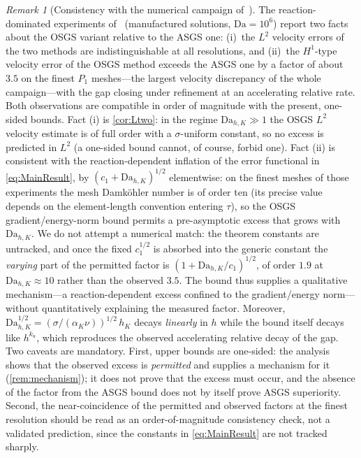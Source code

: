 \documentclass[11pt]{article}
\theoremstyle{remark}
\newtheorem{remark}[theorem]{Remark}
\newcommand{\Dah}{\mathrm{Da}_{h,K}}
\begin{document}
\begin{remark}[Consistency with the numerical campaign of~\cite{companion}]
\label{rem:numerics}
The reaction-dominated experiments of~\cite{companion} (manufactured
solutions, $\mathrm{Da} = 10^6$) report two facts about the OSGS variant relative to the ASGS
one: (i)~the $L^2$ velocity errors of the two methods are indistinguishable at all
resolutions, and (ii)~the $H^1$-type velocity error of the OSGS method exceeds the
ASGS one by a factor of about $3.5$ on the finest $P_1$ meshes---the largest velocity
discrepancy of the whole campaign---with the gap closing under refinement at an
accelerating relative rate. Both observations are compatible in order of magnitude with
the present, one-sided bounds. Fact (i) is \cref{cor:Ltwo}: in the regime $\Dah \gg 1$ the
OSGS $L^2$ velocity estimate is of full order with a $\sigma$-uniform constant, so no excess
is predicted in $L^2$ (a one-sided bound cannot, of course, forbid one). Fact (ii) is consistent with the
reaction-dependent inflation of the error functional in \cref{eq:MainResult}, by
$(c_1+\Dah)^{1/2}$ elementwise: on the finest meshes of those experiments the mesh
Damk\"ohler number is of order ten (its precise value depends on the element-length
convention entering $\tau$), so the OSGS gradient/energy-norm bound permits a
pre-asymptotic excess that grows with $\Dah$. We do not attempt a numerical match:
the theorem constants are untracked, and once the fixed $c_1^{1/2}$ is absorbed into the
generic constant the \emph{varying} part of the permitted factor is $(1+\Dah/c_1)^{1/2}$,
of order $1.9$ at $\Dah\approx10$ rather than the observed $3.5$. The bound thus supplies a
qualitative mechanism---a reaction-dependent excess confined to the gradient/energy
norm---without quantitatively explaining the measured factor. Moreover,
$\Dah^{1/2} = (\sigma/(\alpha_K\nu))^{1/2}\, h_K$ decays \emph{linearly} in $h$ while
the bound itself decays like $h^{k_u}$, which reproduces the observed accelerating
relative decay of the gap. Two caveats are mandatory. First, upper bounds are
one-sided: the analysis shows that the observed excess is \emph{permitted} and
supplies a mechanism for it (\cref{rem:mechanism}); it does not prove that the excess
must occur, and the absence of the factor from the ASGS bound does not by itself prove
ASGS superiority. Second, the near-coincidence of the permitted and observed factors
at the finest resolution should be read as an order-of-magnitude consistency check,
not a validated prediction, since the constants in \cref{eq:MainResult} are not
tracked sharply.
\end{remark}
\end{document}
